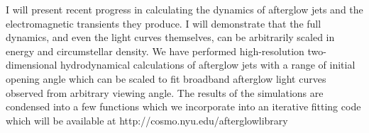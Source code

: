


\bigskip



\bigskip

\noindent I will present recent progress in calculating the dynamics of
afterglow jets and the electromagnetic transients they produce.  I
will demonstrate that the full dynamics, and even the light curves
themselves, can be arbitrarily scaled in energy and circumstellar
density. We have performed high-resolution two-dimensional
hydrodynamical calculations of afterglow jets with a range of initial
opening angle which can be scaled to fit broadband afterglow light curves
observed from arbitrary viewing angle.  The results of the simulations
are condensed into a few functions which we incorporate into an
iterative fitting code which will be available at
http://cosmo.nyu.edu/afterglowlibrary
